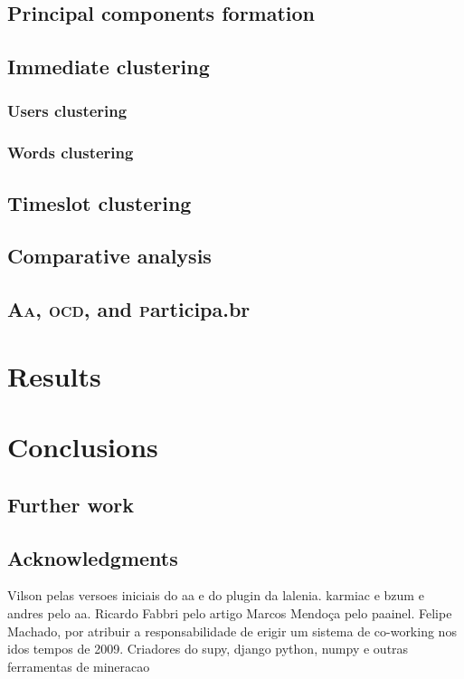 \documentclass[a4paper, 11pt]{article} %
\newcommand{\ocd}{\textsc{ocd}}
\newcommand{\participa}{\textsc{p}articipa.br}
\newcommand{\aai}{\textsc{Aa}}
\begin{document}
\subsection{Principal components formation}
\subsection{Immediate clustering}
\subsubsection{Users clustering}
\subsubsection{Words clustering}
\subsection{Timeslot clustering}
\subsection{Comparative analysis}
\subsection{\aai, \ocd, and \participa}

\section{Results}\label{sec:res}

\section{Conclusions}\label{sec:con}
\subsection{Further work}
\subsection{Acknowledgments}
Vilson pelas versoes iniciais do aa e do plugin da lalenia.
karmiac e bzum e andres pelo aa.
Ricardo Fabbri pelo artigo
Marcos Mendoça pelo paainel.
Felipe Machado, por atribuir a responsabilidade de erigir um sistema de co-working nos idos tempos de 2009.
Criadores do supy, django python, numpy e outras ferramentas de mineracao
\end{document}
